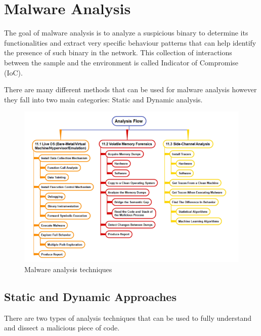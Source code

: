 
\chapter{Malware Analysis}
\label{chap:1}


The goal of malware analysis is to analyze a suspicious binary to determine its functionalities and extract very specific behaviour patterns that can help identify the presence of such binary in the network. This collection of interactions between the sample and the environment is called Indicator of Compromise (IoC).

There are many different methods that can be used for malware analysis however they fall into two main categories: Static and Dynamic analysis. 

\noindent
\begin{figure}[htp]
\centering
\includegraphics[width=\linewidth]{images/dynanalysis.png}
\caption{Malware analysis techniques}
\label{fig:mat}
\end{figure}

\section{Static and Dynamic Approaches}
There are two types of analysis techniques that can be used to fully understand and dissect a malicious piece of code.


